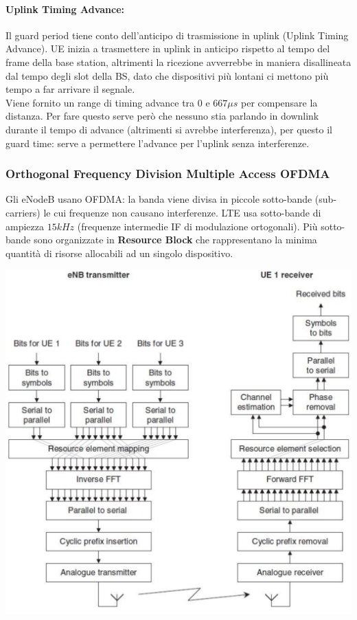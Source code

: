 \paragraph{Uplink Timing Advance:} Il guard period tiene conto dell'anticipo di trasmissione in uplink (Uplink Timing Advance). UE inizia a trasmettere in uplink in anticipo rispetto al tempo del frame della base station, altrimenti la ricezione avverrebbe in maniera disallineata dal tempo degli slot della BS, dato che dispositivi più lontani ci mettono più tempo a far arrivare il segnale. \\

Viene fornito un range di timing advance tra $0$ e $667\mu s$ per compensare la distanza. Per fare questo serve però che nessuno stia parlando in downlink durante il tempo di advance (altrimenti si avrebbe interferenza), per questo il guard time: serve a permettere l'advance per l'uplink senza interferenze.\\

\newpage

\subsubsection{Orthogonal Frequency Division Multiple Access OFDMA}

Gli eNodeB usano OFDMA: la banda viene divisa in piccole sotto-bande (sub-carriers) le cui frequenze non causano interferenze. LTE usa sotto-bande di ampiezza $15 kHz$ (frequenze intermedie IF di modulazione ortogonali). Più sotto-bande sono organizzate in \textbf{Resource Block} che rappresentano la minima quantità di risorse allocabili ad un singolo dispositivo.

\begin{center}
	\includegraphics[width=0.75\linewidth]{img/4g/utranofdma}
\end{center}

